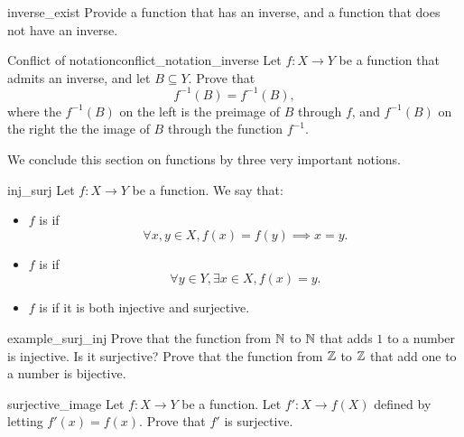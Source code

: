 \begin{cex}{}{inverse_exist}
    Provide a function that has an inverse, and a function that does not have an inverse.
\end{cex}

\begin{cex}{Conflict of notation}{conflict_notation_inverse}
    Let \( f : X \to Y \) be a function that admits an inverse, and let \( B \subseteq Y \). Prove that
    \begin{equation*}
        f^{-1}(B) = f^{-1}(B),
    \end{equation*}
    where the \( f^{-1}(B) \) on the left is the preimage of \( B \) through \( f \), and \( f^{-1}(B) \) on the right the the image of \( B \) through the function \( f^{-1} \).
\end{cex}

We conclude this section on functions by three very important notions.

\begin{cdef}{}{inj_surj}
    Let \( f : X \to Y \) be a function. We say that:
    \begin{itemize}
        \item \( f \) is  if 
        \begin{equation*}
            \forall x, y \in X, f(x) = f(y) \implies x = y. 
        \end{equation*}
        \item \( f \) is  if
        \begin{equation*}
            \forall y \in Y, \exists x \in X, f(x) = y.    
        \end{equation*}
        \item \( f \) is  if it is both injective and surjective.
    \end{itemize} 
\end{cdef}

\begin{cex}{}{example_surj_inj}
    Prove that the function from \( \mathbb{N} \) to \( \mathbb{N} \) that adds \( 1 \) to a number is injective. Is it surjective? Prove that the function from \( \mathbb{Z} \) to \( \mathbb{Z} \) that add one to a number is bijective. 
\end{cex}
\begin{cex}{}{surjective_image}
    Let \( f : X \to Y \) be a function. Let \( f' : X \to f(X) \) defined by letting \( f'(x) = f(x) \). Prove that \( f' \) is surjective.
\end{cex}

